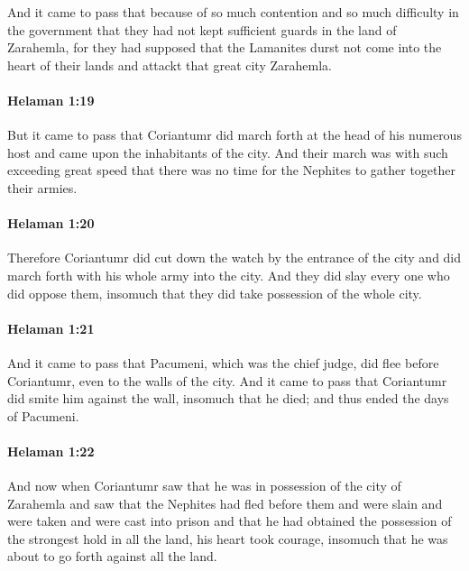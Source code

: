 			And it came to pass that
			because of so much contention and so much difficulty in the government
			that they had not kept sufficient guards in the land of Zarahemla,
			for they had supposed that the Lamanites durst not come
			into the heart of their lands and attackt that great city Zarahemla.

		\paragraph{Helaman 1:19} %
			\label{HELAMAN-1-19}

			But it came to pass that Coriantumr did march forth
			at the head of his numerous host and came upon the inhabitants of the city.
			And their march was with such exceeding great speed
			that there was no time for the Nephites to gather together their armies.

		\paragraph{Helaman 1:20} %
			\label{HELAMAN-1-20}

			Therefore Coriantumr did cut down the watch by the entrance of the city
			and did march forth with his whole army into the city.
			And they did slay every one who did oppose them,
			insomuch that they did take possession of the whole city.

		\paragraph{Helaman 1:21} %
			\label{HELAMAN-1-21}

			And it came to pass that Pacumeni, which was the chief judge,
			did flee before Coriantumr, even to the walls of the city.
			And it came to pass that Coriantumr did smite him against the wall,
			insomuch that he died;
			and thus ended the days of Pacumeni.

		\paragraph{Helaman 1:22} %
			\label{HELAMAN-1-22}

			And now when Coriantumr saw
			that he was in possession of the city of Zarahemla
			and saw that the Nephites had fled before them and were slain
			and were taken and were cast into prison
			and that he had obtained the possession of the strongest hold in all the land,
			his heart took courage,
			insomuch that he was about to go forth against all the land.


